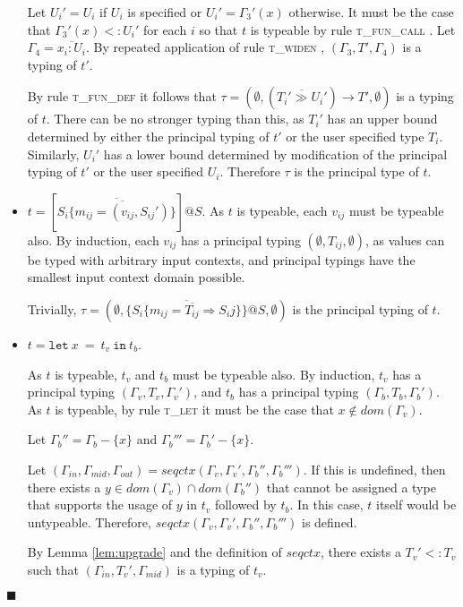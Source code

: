 \documentclass[preprint]{sigplanconf}
\newcommand{\lemref}[1]{Lemma \ref{#1}}
\newcommand{\tfundef}{\textsc{t\_fun\_def} }
\newcommand{\tlet}{\textsc{t\_let} }
\newcommand{\tfunc}{\textsc{t\_fun\_call} }
\newcommand{\twiden}{\textsc{t\_widen} }
\newcommand{\funt}[3]{(\overline{#1 \gg #2}) \rightarrow #3}
\newcommand{\lett}[3]{\mathtt{let}\:#1\:\mathtt{=}\:#2\:\mathtt{in}\:#3}
\newcommand{\qed}{$\blacksquare$}
\newenvironment{proof}{\vspace{1ex}\noindent{\bf Proof}\hspace{0.5em}}
  {\hfill\qed\vspace{1ex}}
\begin{document}
\begin{proof}
\begin{itemize}
Let $U_i' = U_i$ if $U_i$ is specified or $U_i' = \Gamma_3'(x)$ otherwise.
It must be the case that $\Gamma_3'(x) <: U_i'$ for each $i$ so that
$t$ is typeable by rule \tfunc.
Let $\Gamma_4 = \overline{x_i : U_i}$.
By repeated application of rule \twiden, 
$(\Gamma_3,T',\Gamma_4)$ is a typing of $t'$.

By rule \tfundef it follows that
$\tau = (\emptyset, \funt{T_i'}{U_i'}{T'}, \emptyset)$ is a typing of $t$. 
There can be no stronger typing than this, as $T_i'$ has an upper bound
determined by either the principal typing of $t'$ or the user specified
type $T_i$. Similarly, $U_i'$ has a lower bound determined by
modification of the principal typing of $t'$ or the user specified
$U_i$. Therefore $\tau$ is the principal type of $t$.

\item $t = \left[ \overline{S_i \{ \overline{ m_{ij} = (v_{ij},S_{ij}') } \} } \right]@S$.
As $t$ is typeable, each $v_{ij}$ must be typeable also.
By induction, each $v_{ij}$ has a principal typing $(\emptyset, T_{ij}, \emptyset)$,
as values can be typed with arbitrary input contexts, and principal typings
have the smallest input context domain possible.

Trivially, $\tau = (\emptyset,\{ \overline{ S_i \{ \overline{ m_{ij} = T_{ij} \Rightarrow S_ij } \} } \}@S,\emptyset)$ is
the principal typing of $t$.

\item $t = \lett{x}{t_v}{t_b}$.

As $t$ is typeable, $t_v$ and $t_b$ must be typeable also.
By induction, $t_v$ has a principal typing $(\Gamma_v,T_v,\Gamma_v')$, and
$t_b$ has a principal typing $(\Gamma_b,T_b,\Gamma_b')$.
As $t$ is typeable, by rule \tlet it must be the case that 
$x \notin dom(\Gamma_v)$.

Let $\Gamma_b'' = \Gamma_b - \{x\}$ and
$\Gamma_b''' = \Gamma_b' - \{x\}$.

Let $(\Gamma_{in}, \Gamma_{mid}, \Gamma_{out}) = seqctx(\Gamma_v, \Gamma_v', \Gamma_b'', \Gamma_b''')$.
If this is undefined, then there exists a $y \in dom(\Gamma_v) \cap dom(\Gamma_b'')$
that cannot be assigned a type that supports the usage of $y$ in $t_v$
followed by $t_b$. In this case, $t$ itself would be untypeable. 
Therefore, $seqctx(\Gamma_v, \Gamma_v', \Gamma_b'', \Gamma_b''')$
is defined.

By \lemref{lem:upgrade} and the definition of $\mathit{seqctx}$, 
there exists a $T_v' <: T_v$ such that
$(\Gamma_{in}, T_v', \Gamma_{mid})$ is a typing of $t_v$.


\end{itemize}
\end{proof}
\end{document}
